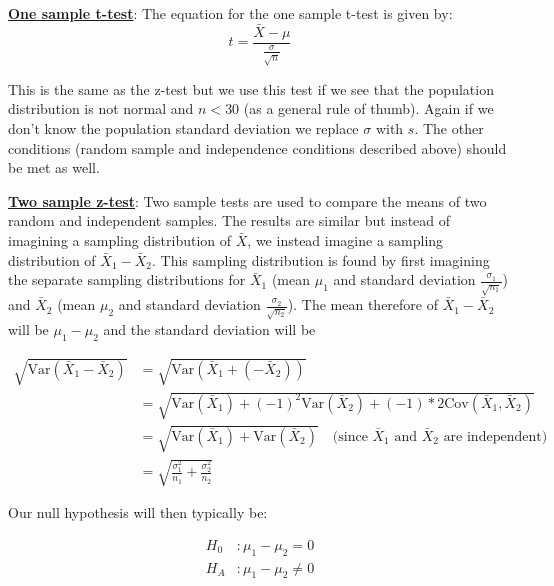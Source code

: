 \noindent \underline{\textbf{One sample t-test}}:
The equation for the one sample t-test is given by:
\begin{equation}
t= \frac{\bar{X} - \mu}{\frac{\sigma}{\sqrt{n}}}
\end{equation}

This is the same as the z-test but we use this test if we see that the population distribution is not normal and $n<30$ (as a general rule of thumb). Again if we don't know the population standard deviation we replace $\sigma$ with $s$. The other conditions (random sample and independence conditions described above) should be met as well.
\newline

\noindent \underline{\textbf{Two sample z-test}}:
Two sample tests are used to compare the means of two random and independent samples. The results are similar but instead of imagining a sampling distribution of $\bar{X}$, we instead imagine a sampling distribution of $\bar{X}_1 - \bar{X}_2$. This sampling distribution is found by first imagining the separate sampling distributions for $\bar{X}_1$ (mean $\mu_1$ and standard deviation $\frac{\sigma_1}{\sqrt{n_1}}$) and $\bar{X}_2$ (mean $\mu_2$ and standard deviation $\frac{\sigma_2}{\sqrt{n_2}}$). The mean therefore of $\bar{X}_1 - \bar{X}_2$ will be $\mu_1 - \mu_2$ and the standard deviation will be

\begin{equation}
\begin{split}
\sqrt{\text{Var}(\bar{X}_1 - \bar{X}_2)} & = \sqrt{\text{Var}(\bar{X}_1 + (- \bar{X}_2))} \\
&=\sqrt{\text{Var}(\bar{X}_1) + (-1)^2 \text{Var}(\bar{X}_2) + (-1)*2\text{Cov}(\bar{X}_1, \bar{X}_2)} \\
&=\sqrt{\text{Var}(\bar{X}_1) + \text{Var}(\bar{X}_2)}  \hspace{1em}   \text{(since $\bar{X}_1$ and $\bar{X}_2$ are independent)}\\
&=\sqrt{ \frac{\sigma_1^2}{n_1} + \frac{\sigma_2^2}{n_2}}
\end{split}
\end{equation}

Our null hypothesis will then typically be:

\begin{equation}
\begin{split}
H_0 &: \mu_1 - \mu_2 = 0 \\
H_A &:   \mu_1 - \mu_2 \neq 0
\end{split}
\end{equation}

